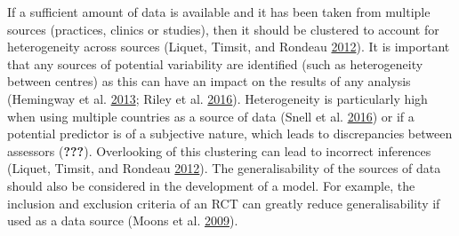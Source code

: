 \documentclass[
]{article}
\begin{document}
If a sufficient amount of data is available and it has been taken from multiple sources (practices, clinics or studies), then it should be clustered to account for heterogeneity across sources (Liquet, Timsit, and Rondeau \protect\hyperlink{ref-liquet_investigating_2012}{2012}). It is important that any sources of potential variability are identified (such as heterogeneity between centres) as this can have an impact on the results of any analysis (Hemingway et al. \protect\hyperlink{ref-hemingway_prognosis_2013}{2013}; Riley et al. \protect\hyperlink{ref-riley_external_2016}{2016}). Heterogeneity is particularly high when using multiple countries as a source of data (Snell et al. \protect\hyperlink{ref-snell_multivariate_2016}{2016}) or if a potential predictor is of a subjective nature, which leads to discrepancies between assessors ({\textbf{???}}). Overlooking of this clustering can lead to incorrect inferences (Liquet, Timsit, and Rondeau \protect\hyperlink{ref-liquet_investigating_2012}{2012}). The generalisability of the sources of data should also be considered in the development of a model. For example, the inclusion and exclusion criteria of an RCT can greatly reduce generalisability if used as a data source (Moons et al. \protect\hyperlink{ref-moons_prognosis_2009}{2009}).
\end{document}
